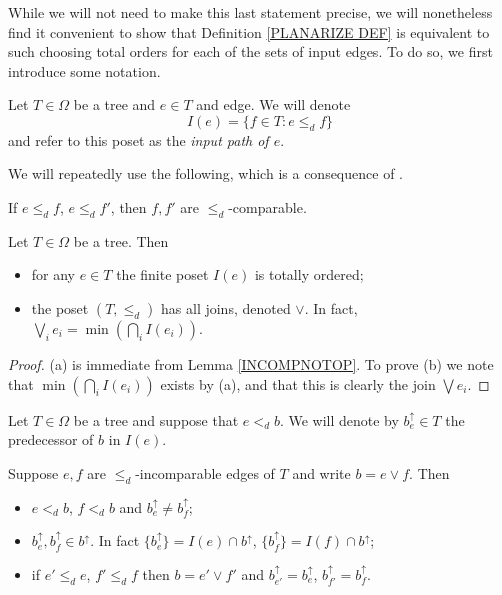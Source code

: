 \documentclass[a4paper,10pt]{article}%
\begin{document}
While we will not need to make this last statement precise, we will nonetheless find it convenient to show that Definition \ref{PLANARIZE DEF} is equivalent to such choosing total orders for each of the sets of input edges.
To do so, we first introduce some notation.


\begin{notation}\label{INPUTPATH NOT}
  Let $T \in \Omega$ be a tree and $e \in T$ and edge. We will denote
  \[ I(e) =\{f \in T \colon e \leq_d f \} \]
  and refer to this poset as the \textit{input path of $e$}.
\end{notation}

We will repeatedly use the following, which is a consequence of \cite[Cor. 5.26]{Pe17}.

\begin{lemma}\label{INCOMPNOTOP}
  If $e \leq_d f$, $e \leq_d f'$, then $f,f'$ are $\leq_d$-comparable. 
\end{lemma} 

\begin{proposition}\label{INPUTPATHS PROP}
  Let $T \in \Omega$ be a tree. Then
  \begin{itemize}
  \item[(a)] for any $e \in T$ the finite poset $I(e)$ is totally ordered;
  \item[(b)] the poset $(T,\leq_d)$ has all joins, denoted $\vee$. In fact, $\bigvee_{i} e_i = \min (\bigcap_{i} I(e_i))$.
  \end{itemize}
\end{proposition}

\begin{proof}
  (a) is immediate from Lemma \ref{INCOMPNOTOP}.
  To prove (b) we note that 
  $\min (\bigcap_{i} I(e_i))$ exists by (a), and that this is clearly the join $\bigvee{e_i}$.
\end{proof}


\begin{notation}
  Let $T \in \Omega$ be a tree and suppose that $e <_d b$. We will denote by $b^{\uparrow}_e \in T$ the predecessor of $b$ in $I(e)$.
\end{notation}


\begin{proposition}\label{INPUTPREDECESSORPROP PROP}
  Suppose $e,f$ are $\leq_d$-incomparable edges of $T$ and write $b= e \vee f$. Then
  \begin{itemize}
  \item [(a)] $e <_d b$, $f<_d b$ and $b^{\uparrow}_e \neq b^{\uparrow}_f$;
  \item [(b)] $b^{\uparrow}_e, b^{\uparrow}_f \in b^{\uparrow}$. In fact $\{b^{\uparrow}_e\} = I(e) \cap b^{\uparrow}$,
    $\{b^{\uparrow}_f\} = I(f) \cap b^{\uparrow}$;
  \item[(c)] if $e' \leq_d e$, $f' \leq_d f$ then 
    $b = e' \vee f'$ and $b^{\uparrow}_{e'} = b^{\uparrow}_{e}$, $b^{\uparrow}_{f'} = b^{\uparrow}_{f}$.
  \end{itemize}
\end{proposition}
\end{document}
